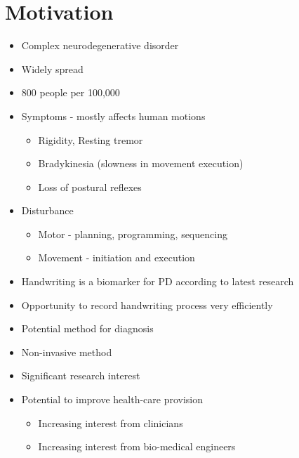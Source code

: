 \section{Motivation}

\begin{itemize}

    \item Complex neurodegenerative disorder
    \item Widely spread
    \item 800 people per 100,000
    \item Symptoms - mostly affects human motions
    
        \begin{itemize}
            \item Rigidity, Resting tremor
            \item Bradykinesia (slowness in movement execution)
            \item Loss of postural reflexes
         \end{itemize}
    
    \item Disturbance
            \begin{itemize}
                \item Motor - planning, programming, sequencing
                \item Movement - initiation and execution
            \end{itemize}
            
\end{itemize}

\begin{itemize}

\item Handwriting is a biomarker for PD according to latest research
\item Opportunity to record handwriting process very efficiently
\item Potential method for diagnosis
\item Non-invasive method 
\item Significant research interest
\item Potential to improve health-care provision

\begin{itemize}
    \item Increasing interest from clinicians
    \item Increasing interest from bio-medical engineers
 \end{itemize}

\end{itemize}
